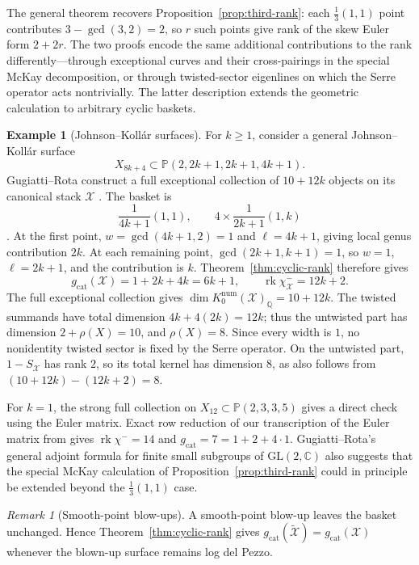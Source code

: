 \documentclass[11pt]{article}
\theoremstyle{plain}
\theoremstyle{definition}
\newtheorem{example}[theorem]{Example}
\theoremstyle{remark}
\newtheorem{remark}[theorem]{Remark}
\newcommand{\cX}{\mathcal X}
\newcommand{\rk}{\operatorname{rk}}
\newcommand{\C}{\mathbb C}
\newcommand{\Q}{\mathbb Q}
\newcommand{\Pj}{\mathbb P}
\newcommand{\1}{\mathbf 1}
\begin{document}
The general theorem recovers Proposition~\ref{prop:third-rank}: each $\frac13(1,1)$ point contributes $3-\gcd(3,2)=2$, so $r$ such points give rank of the skew Euler form $2+2r$.  The two proofs encode the same additional contributions to the rank differently---through exceptional curves and their cross-pairings in the special McKay decomposition, or through twisted-sector eigenlines on which the Serre operator acts nontrivially.  The latter description extends the geometric calculation to arbitrary cyclic baskets.

\begin{example}[Johnson--Koll\'ar surfaces]\label{ex:johnson-kollar-categorical}
For $k\ge1$, consider a general Johnson--Koll\'ar surface
\[
X_{8k+4}\subset\Pj(2,2k+1,2k+1,4k+1).
\]
Gugiatti--Rota construct a full exceptional collection of $10+12k$ objects on its canonical stack $\cX$ \cite[Theorem 5.2]{GR}.  The basket is
\[
\frac1{4k+1}(1,1),\qquad
4\times\frac1{2k+1}(1,k)
\]
\cite[Section 4.1]{GR}.  At the first point, $w=\gcd(4k+1,2)=1$ and $\ell=4k+1$, giving local genus contribution $2k$.  At each remaining point, $\gcd(2k+1,k+1)=1$, so $w=1$, $\ell=2k+1$, and the contribution is $k$.  Theorem~\ref{thm:cyclic-rank} therefore gives
\[
\boxed{g_{\mathrm{cat}}(\cX)=1+2k+4k=6k+1,}
\qquad
\boxed{\rk\chi^-_{\cX}=12k+2.}
\]
The full exceptional collection gives $\dim K_0^{\mathrm{num}}(\cX)_{\Q}=10+12k$.  The twisted summands have total dimension $4k+4(2k)=12k$; thus the untwisted part has dimension $2+\rho(X)=10$, and $\rho(X)=8$.  Since every width is $1$, no nonidentity twisted sector is fixed by the Serre operator.  On the untwisted part, $1-S_{\cX}$ has rank $2$, so its total kernel has dimension $8$, as also follows from $(10+12k)-(12k+2)=8$.

For $k=1$, the strong full collection on $X_{12}\subset\Pj(2,3,3,5)$ gives a direct check using the Euler matrix.  Exact row reduction of our transcription of the Euler matrix from \cite[Remark 5.3, Lemma 5.9, and Tables 1 and 4]{GR} gives $\rk\chi^-=14$ and $g_{\mathrm{cat}}=7=1+2+4\cdot1$.   Gugiatti--Rota's general adjoint formula for finite small subgroups of $\mathrm{GL}(2,\C)$ \cite[Theorem 3.1]{GR} also suggests that the special McKay calculation of Proposition~\ref{prop:third-rank} could in principle be extended beyond the $\frac13(1,1)$ case.
\end{example}

\begin{remark}[Smooth-point blow-ups]\label{rem:smooth-blowup}
A smooth-point blow-up leaves the basket unchanged.  Hence Theorem~\ref{thm:cyclic-rank} gives $g_{\mathrm{cat}}(\widetilde{\cX})=g_{\mathrm{cat}}(\cX)$ whenever the blown-up surface remains log del Pezzo.
\end{remark}
\end{document}
